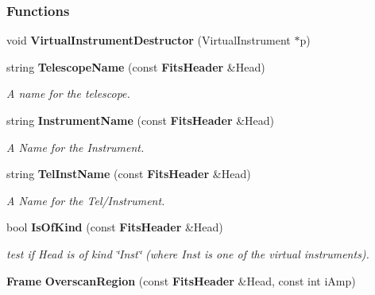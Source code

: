 \subsubsection*{Functions}
\begin{CompactItemize}
\item 
{}
void {\bf Virtual\-Instrument\-Destructor} (Virtual\-Instrument $\ast$p)\label{fitstoad_cc_a21}

\item 
{}
string {\bf Telescope\-Name} (const {\bf Fits\-Header} \&Head)\label{fitstoad_cc_a22}

\begin{CompactList}\small\item\em A name for the telescope.\item\end{CompactList}\item 
{}
string {\bf Instrument\-Name} (const {\bf Fits\-Header} \&Head)\label{fitstoad_cc_a23}

\begin{CompactList}\small\item\em A Name for the Instrument.\item\end{CompactList}\item 
{}
string {\bf Tel\-Inst\-Name} (const {\bf Fits\-Header} \&Head)\label{fitstoad_cc_a24}

\begin{CompactList}\small\item\em A Name for the Tel/Instrument.\item\end{CompactList}\item 
{}
bool {\bf Is\-Of\-Kind} (const {\bf Fits\-Header} \&Head)\label{fitstoad_cc_a25}

\begin{CompactList}\small\item\em test if Head is of kind \char`\"{}Inst\char`\"{} (where Inst is one of the virtual instruments).\item\end{CompactList}\item 
{}
{\bf Frame} {\bf Overscan\-Region} (const {\bf Fits\-Header} \&Head, const int i\-Amp)\label{fitstoad_cc_a26}


\end{CompactItemize}
